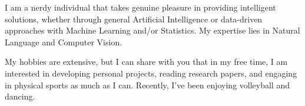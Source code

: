 

\begin{cvparagraph}


\begin{justify}

I am a nerdy individual that takes genuine pleasure in providing intelligent
solutions, whether through general Artificial Intelligence or data-driven
approaches with Machine Learning and/or Statistics. My expertise lies in
Natural Language and Computer Vision.

\noindent My hobbies are extensive, but I can share with you that in my free
time, I am interested in developing personal projects, reading research papers,
and engaging in physical sports as much as I can. Recently, I've been enjoying
volleyball and dancing.

\end{justify}


\end{cvparagraph}
